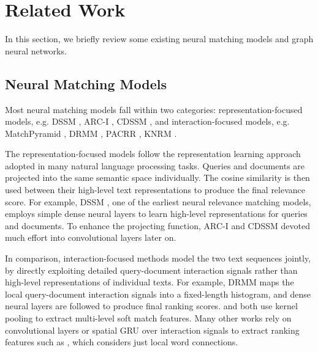 \section{Related Work}
In this section, we briefly review some existing neural matching models and graph neural networks.

\subsection{Neural Matching Models}
Most neural matching models fall within two categories: representation-focused models, e.g. DSSM \cite{huang2013learning}, ARC-I \cite{hu2014convolutional}, CDSSM \cite{shen2014latent}, and interaction-focused models, e.g. MatchPyramid \cite{pang2016text}, DRMM \cite{guo2016deep}, PACRR \cite{hui2017pacrr}, KNRM \cite{xiong2017end}.

The representation-focused models follow the representation learning approach adopted in many natural language processing tasks. Queries and documents are projected into the same semantic space individually. The cosine similarity is then used between their high-level text representations to produce the final relevance score. For example, DSSM \cite{huang2013learning}, one of the earliest neural relevance matching models, employs simple dense neural layers to learn high-level representations for queries and documents. To enhance the projecting function, ARC-I \cite{hu2014convolutional} and CDSSM \cite{shen2014latent} devoted much effort into convolutional layers later on. 

In comparison, interaction-focused methods model the two text sequences jointly, by directly exploiting detailed query-document interaction signals rather than high-level representations of individual texts. For example, DRMM \cite{guo2016deep} maps the local query-document interaction signals into a fixed-length histogram, and dense neural layers are followed to produce final ranking scores. \citet{xiong2017end} and \citet{dai2018convolutional} both use kernel pooling to extract multi-level soft match features. Many other works rely on convolutional layers or spatial GRU over interaction signals to extract ranking features  
such as \cite{pang2016text,pang2017deeprank,hui2017pacrr,hui2018co,fan2018modeling}, which considers just local word connections. 

